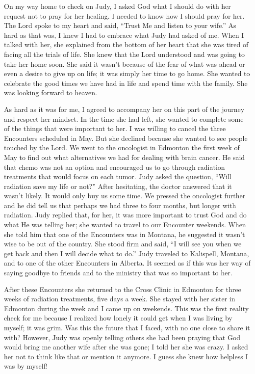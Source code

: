 \documentclass[twoside, 12pt]{book}
\begin{document}
On my way home to check on Judy, I asked God what I should do with her request not to pray for her healing. I needed to know how I should pray for her. The Lord spoke to my heart and said, “Trust Me and listen to your wife.” As hard as that was, I knew I had to embrace what Judy had asked of me. When I talked with her, she explained from the bottom of her heart that she was tired of facing all the trials of life. She knew that the Lord understood and was going to take her home soon. She said it wasn’t because of the fear of what was ahead or even a desire to give up on life; it was simply her time to go home. She wanted to celebrate the good times we have had in life and spend time with the family. She was looking forward to heaven. 

As hard as it was for me, I agreed to accompany her on this part of the journey and respect her mindset. In the time she had left, she wanted to complete some of the things that were important to her. I was willing to cancel the three Encounters scheduled in May. But she declined because she wanted to see people touched by the Lord. 
We went to the oncologist in Edmonton the first week of May to find out what alternatives we had for dealing with brain cancer. He said that chemo was not an option and encouraged us to go through radiation treatments that would focus on each tumor. Judy asked the question, “Will radiation save my life or not?” After hesitating, the doctor answered that it wasn’t likely. It would only buy us some time. We pressed the oncologist further and he did tell us that perhaps we had three to four months, but longer with radiation. Judy replied that, for her, it was more important to trust God and do what He was telling her; she wanted to travel to our Encounter weekends. When she told him that one of the Encounters was in Montana, he suggested it wasn’t wise to be out of the country. She stood firm and said, “I will see you when we get back and then I will decide what to do.” Judy traveled to Kalispell, Montana, and to one of the other Encounters in Alberta. It seemed as if this was her way of saying goodbye to friends and to the ministry that was so important to her. 

After these Encounters she returned to the Cross Clinic in Edmonton for three weeks of radiation treatments, five days a week. She stayed with her sister in Edmonton during the week and I came up on weekends. This was the first reality check for me because I realized how lonely it could get when I was living by myself; it was grim. Was this the future that I faced, with no one close to share it with? However, Judy was openly telling others she had been praying that God would bring me another wife after she was gone; I told her she was crazy. I asked her not to think like that or mention it anymore. I guess she knew how helpless I was by myself!
\end{document}
